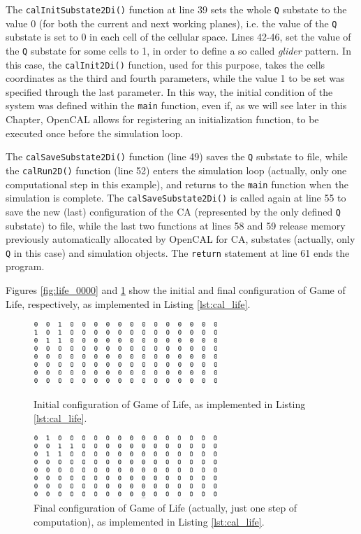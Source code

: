 The \verb'calInitSubstate2Di()' function at line 39 sets the whole
\verb'Q' substate to the value 0 (for both the current and next
working planes), i.e. the value of the \verb'Q' substate is set to 0
in each cell of the cellular space. Lines 42-46, set the value of the
\verb'Q' substate for some cells to 1, in order to define a so called
\emph{glider} pattern. In this case, the \verb'calInit2Di()' function,
used for this purpose, takes the cells coordinates as the third and
fourth parameters, while the value 1 to be set was specified through
the last parameter. In this way, the initial condition of the system
was defined within the \verb'main' function, even if, as we will see
later in this Chapter, OpenCAL allows for registering an
initialization function, to be executed once before the simulation
loop.

The \verb'calSaveSubstate2Di()' function (line 49) saves the \verb'Q'
substate to file, while the \verb'calRun2D()' function (line 52)
enters the simulation loop (actually, only one computational step in
this example), and returns to the \verb'main' function when the
simulation is complete. The \verb'calSaveSubstate2Di()' is called
again at line 55 to save the new (last) configuration of the CA
(represented by the only defined \verb'Q' substate) to file, while the
last two functions at lines 58 and 59 release memory previously
automatically allocated by OpenCAL for CA, substates (actually, only
\verb'Q' in this case) and simulation objects. The \verb'return'
statement at line 61 ends the program.

Figures \ref{fig:life_0000} and \ref{fig:life_LAST} show the initial
and final configuration of Game of Life, respectively, as implemented
in Listing \ref{lst:cal_life}.

\begin{figure}
  \begin{center}
    \includegraphics[width=7cm]{./images/OpenCAL/life_0000}
    \caption{Initial configuration of Game of Life, as implemented in Listing \ref{lst:cal_life}.}
    \label{fig:life_0000}
  \end{center}

    \begin{center}
    \includegraphics[width=7cm]{./images/OpenCAL/life_LAST}
    \caption{Final configuration of Game of Life (actually, just one step of computation), as implemented in Listing \ref{lst:cal_life}.}
    \label{fig:life_LAST}
  \end{center}
\end{figure}

